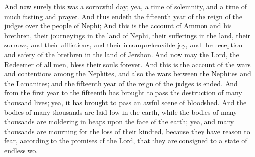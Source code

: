 \bverse \iffalse And now surely this was a sorrowful day; yea, a time of solemnity, and a time of much fasting and prayer. \fi
And now surely this was a sorrowful day; yea, a time of solemnity, and a time of much fasting and prayer.
\bverse \iffalse And thus endeth the fifteenth year of the reign of the judges over the people of Nephi; \fi
And thus endeth the fifteenth year of the reign of the judges over the people of Nephi;
\bverse \iffalse And this is the account of Ammon and his brethren, their journeyings in the land of Nephi, their sufferings in the land, their sorrows, and their afflictions, and their incomprehensible joy, and the reception and safety of the brethren in the land of Jershon. And now may the Lord, the Redeemer of all men, bless their souls forever. \fi
And this is the account of Ammon and his brethren, their journeyings in the land of Nephi, their sufferings in the land, their sorrows, and their afflictions, and their incomprehensible joy, and the reception and safety of the brethren in the land of Jershon. And now may the Lord, the Redeemer of all men, bless their souls forever.
\bverse \iffalse And this is the account of the wars and contentions among the Nephites, and also the wars between the Nephites and the Lamanites; and the fifteenth year of the reign of the judges is ended. \fi
And this is the account of the wars and contentions among the Nephites, and also the wars between the Nephites and the Lamanites; and the fifteenth year of the reign of the judges is ended.
\bverse \iffalse And from the first year to the fifteenth has brought to pass the destruction of many thousand lives; yea, it has brought to pass an awful scene of bloodshed. \fi
And from the first year to the fifteenth has brought to pass the destruction of many thousand lives; yea, it has brought to pass an awful scene of bloodshed.
\bverse \iffalse And the bodies of many thousands are laid low in the earth, while the bodies of many thousands are moldering in heaps upon the face of the earth; yea, and many thousands are mourning for the loss of their kindred, because they have reason to fear, according to the promises of the Lord, that they are consigned to a state of endless wo. \fi
And the bodies of many thousands are laid low in the earth, while the bodies of many thousands are moldering in heaps upon the face of the earth; yea, and many thousands are mourning for the loss of their kindred, because they have reason to fear, according to the promises of the Lord, that they are consigned to a state of endless wo.
